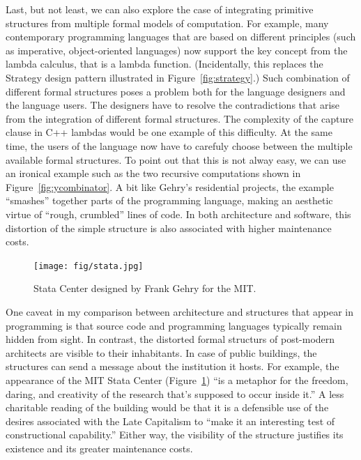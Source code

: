 Last, but not least, we can also explore the case of integrating primitive structures from multiple
formal models of computation. For example, many contemporary programming languages that are based
on different principles (such as imperative, object-oriented languages) now support the
key concept from the lambda calculus, that is a lambda function. (Incidentally, this replaces
the Strategy design pattern illustrated in Figure~\ref{fig:strategy}.) Such combination of
different formal structures poses a problem both for the language designers and the language users.
The designers have to resolve the contradictions that arise from the integration of different
formal structures. The complexity of the capture clause in C++ lambdas would be one example
of this difficulty.
At the same time, the users of the language now have to carefuly choose between the multiple
available formal structures. To point out that this is not alway easy, we can use an ironical
example such as the two recursive computations shown in Figure~\ref{fig:ycombinator}. A bit like Gehry's residential projects, the
example ``smashes'' together parts of the programming language, making an aesthetic virtue of
``rough, crumbled'' lines of code. In both architecture and software, this distortion of the
simple structure is also associated with higher maintenance costs.

\begin{figure}
\centering
\vspace{-1em}
\texttt{[image: fig/stata.jpg]}
\caption{Stata Center designed by Frank Gehry for the MIT.}
\label{fig:stata}
\vspace{-0.5em}
\end{figure}

One caveat in my comparison between architecture and structures that appear in programming is
that source code and programming languages typically remain hidden from sight. In contrast, the
distorted formal structurs of post-modern architects are visible to their inhabitants. In case of
public buildings, the structures can send a message about the institution it hosts. For example,
the appearance of the MIT Stata Center (Figure~\ref{fig:stata}) ``is a metaphor for the freedom,
daring, and creativity of the research that's supposed to occur inside it.''
A less charitable reading of the building would be that it is a defensible use of the
desires associated with the Late Capitalism to ``make it an interesting test of constructional
capability.'' Either way, the
visibility of the structure justifies its existence and its greater maintenance costs.

